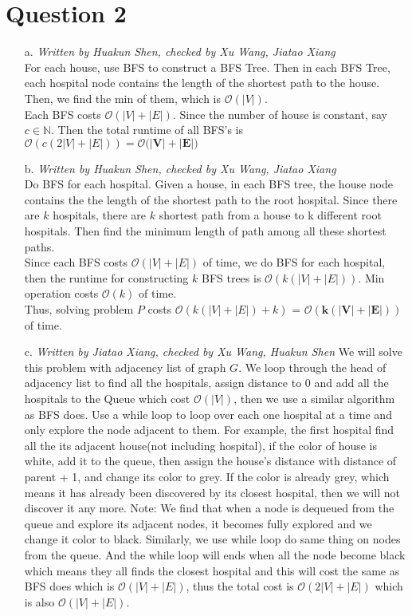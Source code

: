\documentclass[10pt]{article}
\begin{document}
\section*{Question 2}
\begin{itemize}
\item[a.] \textit{Written by Huakun Shen, checked by Xu Wang, Jiatao Xiang}\\
For each house, use BFS to construct a BFS Tree. Then in each BFS Tree, each hospital node contains the length of the shortest path to the house. Then, we find the min of them, which is $\mathcal{O}(|V|)$.\\
Each BFS costs $\mathcal{O}(|V|+|E|)$. Since the number of house is constant, say $c\in\mathbb{N}$. Then the total runtime of all BFS's is $\mathcal{O}(c(2|V|+|E|))=\boldsymbol{\mathcal{O}(|V|+|E|})$
\item[b.]\textit{Written by Huakun Shen, checked by Xu Wang, Jiatao Xiang}\\
Do BFS for each hospital. Given a house, in each BFS tree, the house node contains the the length of the shortest path to the root hospital. Since there are $k$ hospitals, there are $k$ shortest path from a house to k different root hospitals. Then find the minimum length of path among all these shortest paths.\\
Since each BFS costs $\mathcal{O}(|V|+|E|)$ of time, we do BFS for each hospital, then the runtime for constructing $k$ BFS trees is $\mathcal{O}(k(|V|+|E|))$. Min operation costs $\mathcal{O}(k)$ of time.\\
Thus, solving problem $P$ costs $\mathcal{O}(k(|V|+|E|)+k)$ = $\boldsymbol{\mathcal{O}(k(|V|+|E|))}$ of time.
\item[c.]\textit{Written by Jiatao Xiang, checked by Xu Wang, Huakun Shen}
We will solve this problem with adjacency list of graph $G$. We loop through the head of adjacency list to find all the hospitals, assign distance to 0 and add all the hospitals to the Queue which cost $\mathcal{O}(|V|)$, then we use a similar algorithm as BFS does. Use a while loop to loop over each one hospital at a time and only explore the node adjacent to them. For example, the first hospital find all the its adjacent house(not including hospital), if the color of house is white, add it to the queue, then assign the house's distance with distance of parent + 1,  and change its color to grey. If the color is already grey, which means it has already been discovered by its closest hospital, then we will not discover it any more. Note: We find that when a node is dequeued from the queue and explore its adjacent nodes, it becomes fully explored and we change it color to black. Similarly, we use while loop do same thing on nodes from the queue. And the while loop will ends when all the node become black which means they all finds the closest hospital and this will cost the same as BFS does which is $\mathcal{O}(|V|+|E|)$, thus the total cost is $\mathcal{O}(2|V| + |E|)$ which is also $\mathcal{O}(|V| + |E|)$.

\end{itemize}
\end{document}
